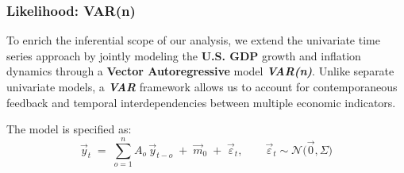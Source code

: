 \documentclass{Configuration_Files/PoliMi3i_thesis}
\begin{document}
\subsubsection{Likelihood: VAR(n)}
To enrich the inferential scope of our analysis, we extend the univariate time series approach by jointly modeling the \textbf{U.S. GDP} growth and inflation dynamics through a \textbf{Vector Autoregressive} model \textbf{\textit{VAR(n)}}. Unlike separate univariate models, a \textbf{\textit{VAR}} framework allows us to account for contemporaneous feedback and temporal interdependencies between multiple economic indicators.

The model is specified as:
\[
\vec{y}_t
\;=\;
\sum_{o=1}^{n} A_{o}\,\vec y_{t-o}
\;+\;
\vec m_{0}
\;+\;
\vec \varepsilon_t,
\qquad
\vec \varepsilon_t \sim \mathcal{N}\bigl(\vec 0,\Sigma)
\]
\end{document}
